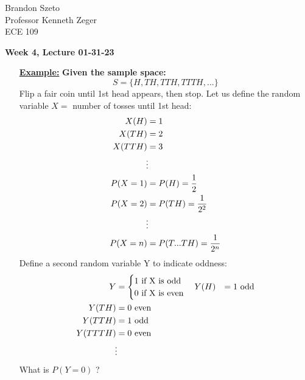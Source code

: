 \documentclass[10pt]{article}
\begin{document}
\begin{flushleft}
    Brandon Szeto \\
    Professor Kenneth Zeger \\
	ECE 109 \\
\end{flushleft}

\begin{center}
	\Large \textbf{Week 4, Lecture 01-31-23}
\end{center}
\normalsize

\begin{flushleft}

\begin{itemize}
    \item[\textbf{\underline{Example:}}] \textbf{Given the sample space:}
        $$ S = \{H, TH, TTH, TTTH, ... \} $$
        Flip a fair coin until 1st head appears, then stop. 
        Let us define the random variable $X = $ number of tosses until 1st head:
        $$ \begin{aligned}
            X(H) &= 1 \\
            X(TH) &= 2 \\
            X(TTH) &= 3 \\
            \vdotswithin{} \\
            P(X = 1) &= P(H) = \frac{1}{2} \\
            P(X = 2) &= P(TH) = \frac{1}{2^2} \\
            \vdotswithin{} \\
            P(X = n) &= P(T ... TH) = \frac{1}{2^n} \\
        \end{aligned} $$
        Define a second random variable Y to indicate oddness:
        $$ \begin{aligned} Y &= 
        \begin{cases}
            1 \text{ if X is odd} \\
            0 \text{ if X is even} \\
        \end{cases}
        Y(H) &= 1 \text{     odd} \\
        Y(TH) &= 0 \text{     even} \\
        Y(TTH) &= 1 \text{     odd} \\
        Y(TTTH) &= 0 \text{     even} \\
        \vdotswithin{}
    \end{aligned}
        $$
        What is $P(Y = 0)$ ?
        $$ \begin{aligned}

\end{aligned}$$
\end{itemize}
\end{flushleft}
\end{document}
